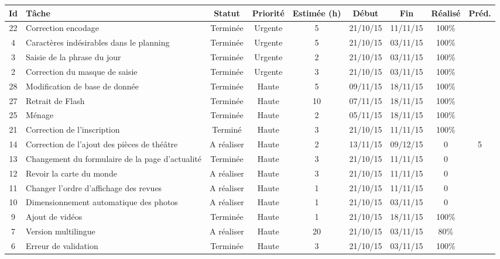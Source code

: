 \begin{tabular}{ | c | p{4cm} | c | c | c | c | c | c | c |  }
\hline 
Id & Tâche & Statut & Priorité & Estimée (h) & Début & Fin & Réalisé &
Préd. \\ \hline


22 & Correction encodage & Terminée & Urgente & 5 & 21/10/15 & 11/11/15 & 100\%
	 & \\ \hline
4 & Caractères indésirables dans le planning & Terminée & Urgente & 5 & 21/10/15
	& 03/11/15 & 100\% & \\ \hline
3 & Saisie de la phrase du jour & Terminée & Urgente & 2 & 21/10/15 & 03/11/15
	& 100\% & \\ \hline
2 & Correction du masque de saisie & Terminée & Urgente & 3 & 21/10/15 &
	03/11/15 & 100\% & \\ \hline
	
28 & Modification de base de donnée & Terminée & Haute & 5 & 09/11/15 & 18/11/15
& 100\% & \\ \hline
27 & Retrait de Flash & Terminée & Haute & 10 & 07/11/15 & 18/11/15 & 100\%
& \\ \hline
25 & Ménage & Terminée & Haute & 2 & 05/11/15 & 18/11/15 & 100\%
& \\ \hline
21 & Correction de l'inscription & Terminé & Haute & 3 & 21/10/15 &
	11/11/15 & 100\% & \\ \hline
14 & Correction de l'ajout des pièces de théâtre & A réaliser & Haute & 2 &
	13/11/15 & 09/12/15 & 0 & 5 \\ \hline
13 & Changement du formulaire de la page d'actualité & Terminée & Haute & 3 &
	21/10/15 & 11/11/15 & 0 & \\ \hline
12 & Revoir la carte du monde & A réaliser & Haute & 3 & 21/10/15 & 11/11/15 & 0
	& \\ \hline
11 & Changer l'ordre d'affichage des revues & A réaliser & Haute & 1 & 21/10/15
	& 11/11/15 & 0 & \\ \hline
10 & Dimensionnement automatique des photos & A réaliser & Haute & 1 & 21/10/15
	& 03/11/15 & 0 & \\ \hline
9 & Ajout de vidéos & Terminée & Haute & 1 & 21/10/15 & 18/11/15 & 100\% & \\
\hline
7 & Version multilingue & A réaliser & Haute & 20 & 21/10/15 & 03/11/15 & 80\% &
\\
\hline
6 & Erreur de validation & Terminée & Haute & 3 & 21/10/15 & 03/11/15 & 100\%
& \\ \hline




\end{tabular}
